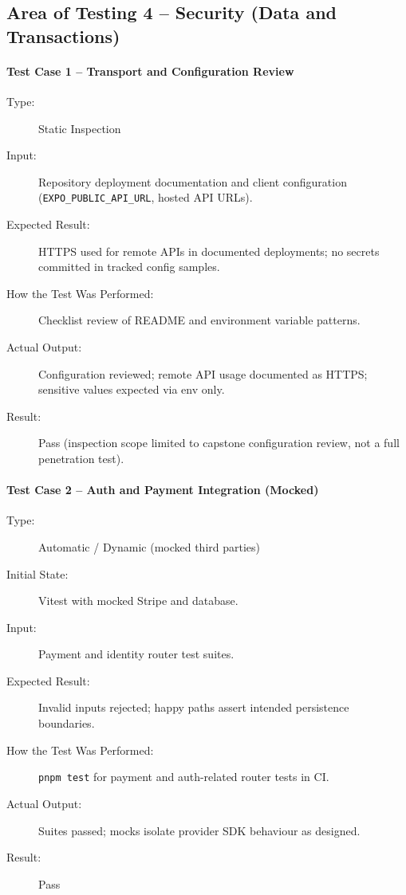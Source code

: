 \subsection{Area of Testing 4 – Security (Data and Transactions)}

\paragraph{Test Case 1 – Transport and Configuration Review} \label{test-S1-1}
\begin{description}
    \item[Type:] Static Inspection
    \item[Input:] Repository deployment documentation and client configuration (\texttt{EXPO\_PUBLIC\_API\_URL}, hosted API URLs).
    \item[Expected Result:] HTTPS used for remote APIs in documented deployments; no secrets committed in tracked config samples.
    \item[How the Test Was Performed:] Checklist review of README and environment variable patterns.
    \item[Actual Output:] Configuration reviewed; remote API usage documented as HTTPS; sensitive values expected via env only.
    \item[Result:] Pass (inspection scope limited to capstone configuration review, not a full penetration test).
\end{description}

\paragraph{Test Case 2 – Auth and Payment Integration (Mocked)} \label{test-S1-2}
\begin{description}
    \item[Type:] Automatic / Dynamic (mocked third parties)
    \item[Initial State:] Vitest with mocked Stripe and database.
    \item[Input:] Payment and identity router test suites.
    \item[Expected Result:] Invalid inputs rejected; happy paths assert intended persistence boundaries.
    \item[How the Test Was Performed:] \texttt{pnpm test} for payment and auth-related router tests in CI.
    \item[Actual Output:] Suites passed; mocks isolate provider SDK behaviour as designed.
    \item[Result:] Pass
\end{description}

